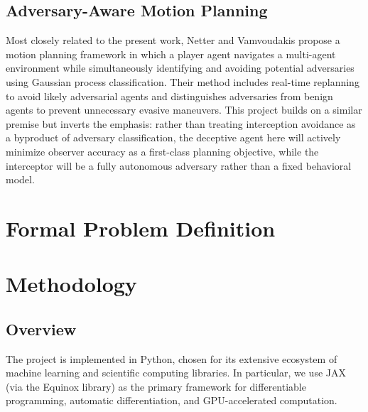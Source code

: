 \documentclass[letterpaper, 10pt, conference]{ieeeconf}
\begin{document}
\subsection{Adversary-Aware Motion Planning} \label{sec:related-work/adversary-aware-motion-planning}

Most closely related to the present work, Netter and Vamvoudakis \cite{netter2024motion} propose a motion planning framework in which a player agent navigates a multi-agent environment while simultaneously identifying and avoiding potential adversaries using Gaussian process classification. Their method includes real-time replanning to avoid likely adversarial agents and distinguishes adversaries from benign agents to prevent unnecessary evasive maneuvers. This project builds on a similar premise but inverts the emphasis: rather than treating interception avoidance as a byproduct of adversary classification, the deceptive agent here will actively minimize observer accuracy as a first-class planning objective, while the interceptor will be a fully autonomous adversary rather than a fixed behavioral model.

\section{Formal Problem Definition} \label{sec:formal-problem-definition}

\lipsum[1-2]

\section{Methodology} \label{sec:methodology}

\subsection{Overview} \label{sec:methodology/overview}

The project is implemented in Python, chosen for its extensive ecosystem of machine learning and scientific computing libraries. In particular, we use JAX (via the Equinox library) as the primary framework for differentiable programming, automatic differentiation, and GPU-accelerated computation.
\end{document}
